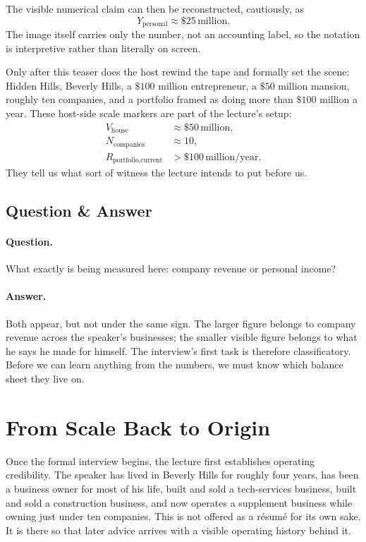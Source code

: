 The visible numerical claim can then be reconstructed, cautiously, as
\begin{equation}
Y_{\text{personal}} \approx \$25\,\text{million}.
\end{equation}
The image itself carries only the number, not an accounting label, so the notation is interpretive rather than literally on screen.

Only after this teaser does the host rewind the tape and formally set the scene: Hidden Hills, Beverly Hills, a \(\$100\) million entrepreneur, a \(\$50\) million mansion, roughly ten companies, and a portfolio framed as doing more than \(\$100\) million a year. These host-side scale markers are part of the lecture's setup:
\begin{align}
V_{\text{house}} &\approx \$50\,\text{million}, \\
N_{\text{companies}} &\approx 10, \\
R_{\text{portfolio,current}} &> \$100\,\text{million}/\text{year}.
\end{align}
They tell us what sort of witness the lecture intends to put before us.

\subsection{Question \& Answer}

\paragraph{Question.} What exactly is being measured here: company revenue or personal income?

\paragraph{Answer.} Both appear, but not under the same sign. The larger figure belongs to company revenue across the speaker's businesses; the smaller visible figure belongs to what he says he made for himself. The interview's first task is therefore classificatory. Before we can learn anything from the numbers, we must know which balance sheet they live on.

\section{From Scale Back to Origin}

Once the formal interview begins, the lecture first establishes operating credibility. The speaker has lived in Beverly Hills for roughly four years, has been a business owner for most of his life, built and sold a tech-services business, built and sold a construction business, and now operates a supplement business while owning just under ten companies. This is not offered as a résumé for its own sake. It is there so that later advice arrives with a visible operating history behind it.

